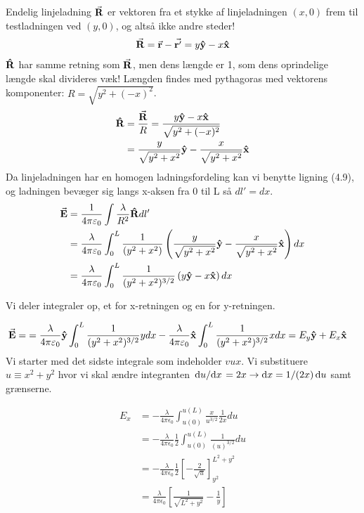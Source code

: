 \documentclass[crop=false, class=memoir]{standalone}
\begin{document}
\begin{opgave}{Endelig linjeladning}
\opg $\va{R}$ er vektoren fra et stykke af linjeladningen $(x,0)$ frem til testladningen ved $(y,0)$, og altså ikke andre steder!
\begin{align*}
    \va{R}=\va{r}-\va{r'} = y\vu{y}-x\vu{x}
\end{align*}
\opg $\vu{R}$ har samme retning som $\va{R}$, men dens længde er 1, som dens oprindelige længde skal divideres væk! Længden findes med pythagoras med vektorens komponenter: $R=\sqrt{y^2+(-x)^2}$. 
\begin{align*}
    \vu{R}&=\frac{\va{R}}{R} = \frac{y\vu{y}-x\vu{x}}{\sqrt{y^2+(-x)^2}}\\
    &=\frac{y}{\sqrt{y^2+x^2}}\vu{y}-\frac{x}{\sqrt{y^2+x^2}}\vu{x}
\end{align*}
\opg Da linjeladningen har en homogen ladningsfordeling kan vi benytte ligning (4.9), og ladningen bevæger sig langs x-aksen fra 0 til L så $dl'=dx$. 
\begin{align*}
    \va{E}&=\frac{1}{4\pi \varepsilon_0}\int \frac{\lambda}{R^2}\vu{R}dl'\\
    &=\frac{\lambda}{4\pi \varepsilon_0}\int^L_0 \frac{1}{(y^2+x^2)}\left(\frac{y}{\sqrt{y^2+x^2}}\vu{y}-\frac{x}{\sqrt{y^2+x^2}}\vu{x}\right) dx\\
    &=\frac{\lambda}{4\pi \varepsilon_0}\int^L_0 \frac{1}{(y^2+x^2)^{3/2}}\left(y\vu{y}-x\vu{x}\right) dx
\end{align*}

\opg Vi deler integraler op, et for x-retningen og en for y-retningen. 

\begin{align*}
    \va{E}=&=\frac{\lambda}{4\pi \varepsilon_0}\vu{y}\int^L_0 \frac{1}{(y^2+x^2)^{3/2}}y dx - \frac{\lambda}{4\pi \varepsilon_0} \vu{x}\int^L_0 \frac{1}{(y^2+x^2)^{3/2}}x dx = E_y\vu{y}+E_x\vu{x}
\end{align*}
Vi starter med det sidste integrale som indeholder $vu{x}$. Vi substituere $u\equiv x^2+y^2$ hvor vi skal ændre integranten $\dv*{u}{x} = 2x \rightarrow \dd{x} = 1/(2x)\dd{u}$ samt grænserne.

\begin{align*}
    E_x &= - \frac{\lambda}{4\pi \epsilon_0}\int^{u(L)}_{u(0)} \frac{x}{u^{3/2}} \frac{1}{2x} du \\
    &= - \frac{\lambda}{4\pi \epsilon_0}\frac{1}{2}\int^{u(L)}_{u(0)} \frac{1}{(u)^{3/2}} du \\
    &=-\frac{\lambda}{4\pi \epsilon_0}\frac{1}{2}\left[-\frac{2}{\sqrt{u}} \right]^{L^2+y^2}_{y^2}\\
    &= \frac{\lambda}{4\pi \epsilon_0} \left[\frac{1}{\sqrt{L^2+y^2}}-\frac{1}{y}\right]
\end{align*}


\end{opgave}
\end{document}
